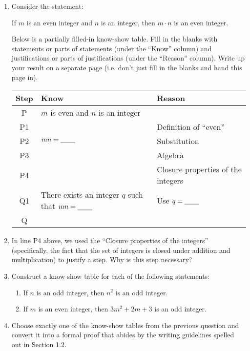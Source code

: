 \documentclass[11pt]{article}
\begin{document}
\begin{enumerate}
	\item Consider the statement: 
	\begin{center}
		If $m$ is an even integer and $n$ is an integer, then $m \cdot n$ is an even integer.
	\end{center}
Below is a partially filled-in know-show table. Fill in the blanks with statements or parts of statements (under the ``Know'' column) and justifications or parts of justifications (under the ``Reason'' column). Write up your result on a separate page (i.e. don't just fill in the blanks and hand this page in). 

		\begin{tabular}{c|l|l}
		Step & Know & Reason \\ \hline
		P & $m$ is even and $n$ is an integer &  \\ 
		P1 &      & Definition of ``even'' \\
		P2 & $mn = \underline{\hspace{0.3in}}$ & Substitution \\ 
		P3 &       & Algebra \\ 
		P4 &       & Closure properties of the integers \\ 
		Q1 & There exists an integer $q$ such that $mn = \underline{\hspace{0.3in}}$ & Use $q = \underline{\hspace{0.3in}}$ \\ 
		Q &   &   
		\end{tabular}
		
	\item In line P4 above, we used the ``Closure properties of the integers'' (specifically, the fact that the set of integers is closed under addition and multiplication) to justify a step. Why is this step necessary? 
	
	\item Construct a know-show table for each of the following statements: 
	\begin{enumerate}
		\item If $n$ is an odd integer, then $n^2$ is an odd integer. 
		\item If $m$ is an even integer, then $3m^2 + 2m + 3$ is an odd integer. 
	\end{enumerate}
	
	\item Choose exactly one of the know-show tables from the previous question and convert it into a formal proof that abides by the writing guidelines spelled out in Section 1.2. 
	
\end{enumerate}	
	
\end{document}
